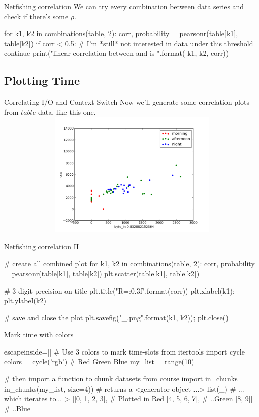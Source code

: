 \begin{pyframe}{Netfishing correlation}
We can try every combination between data series and check if there's some $\rho$.
\begin{pycode}
for k1, k2 in combinations(table, 2):
  corr, probability = pearsonr(table[k1], table[k2])
  if corr < 0.5:
    # I'm *still* not interested in data under this threshold
    continue
  print("linear correlation between {} and {} is {}".format(
    k1, k2, corr))

\end{pycode}
\end{pyframe}

\subsection{Plotting Time}
\begin{pyframe}{Correlating I/O and Context Switch}
{\footnotesize Now we'll generate some correlation plots from $table$ data, like this one.}
\includegraphics[height=6cm,width=14cm]{byte_in_csw.pdf}
\end{pyframe}


\begin{pyframe}{Netfishing correlation II}
\begin{pycode}
# create all combined plot
for k1, k2 in combinations(table, 2):
    corr, probability = pearsonr(table[k1], table[k2])
    plt.scatter(table[k1], table[k2])

    # 3 digit precision on title
    plt.title("R={:0.3f}".format(corr))
    plt.xlabel(k1); plt.ylabel(k2)

    # save and close the plot
    plt.savefig("{}_{}.png".format(k1, k2)); plt.close()
\end{pycode}
\end{pyframe}


\begin{pyframe}{Mark time with colors}
\begin{pycode*}{escapeinside=||}
# Use 3 colors to mark time-slots
from itertools import cycle
colors = cycle('rgb') # Red Green Blue
my_list = range(10)

# then import a function to chunk datasets
from course import in_chunks
in_chunks(my_list, size=4)) # returns a <generator object ...>
list(_) # ... which iterates to...
> [[0, 1, 2, 3], # Plotted in Red
   [4, 5, 6, 7], # ..Green
   [8, 9]]       # ..Blue 
\end{pycode*}
\end{pyframe}

